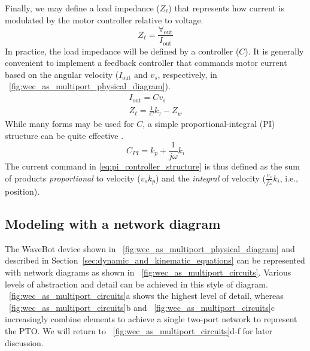 \documentclass[lettersize,journal]{IEEEtran}
\begin{document}
Finally, we may define a load impedance ($Z_\ell$) that represents how current is modulated by the motor controller relative to voltage.
%
\begin{equation}
        Z_\ell = \frac{\forall_{\textrm{out}}}{I_{\textrm{out}}}
        \label{eq:load_impedance}
\end{equation}
%
In practice, the load impedance will be defined by a controller ($C$).
It is generally convenient to implement a feedback controller that commands motor current based on the angular velocity ($I_{\textrm{out}}$ and $v_s$, respectively, in \figurename~\ref{fig:wec_as_multiport_physical_diagram}).
%
\begin{subequations}
\begin{gather}
        I_{\textrm{out}} = C v_s \\  
        Z_\ell = \frac{1}{C} k_\tau - Z_w     
\end{gather}
\end{subequations}
%
While many forms may be used for $C$, a simple proportional-integral (PI) structure can be quite effective \cite{Coe2020a}.
%
\begin{equation}
        C_{PI} = k_p + \frac{1}{j \omega} k_i 
        \label{eq:pi_controller_structure}
\end{equation}
%
The current command in \eqref{eq:pi_controller_structure} is thus defined as the sum of products \emph{proportional} to velocity ($v_s k_p$) and the \emph{integral} of velocity ($\frac{v_s}{j \omega} k_i$, i.e., position).

\subsection{Modeling with a network diagram}\label{sec:modeling_with_a_network_diagram}

The WaveBot device shown in \figurename~\ref{fig:wec_as_multiport_physical_diagram} and described in Section~\ref{sec:dynamic_and_kinematic_equations} can be represented with network diagrams as shown in \figurename~\ref{fig:wec_as_multiport_circuits}.
Various levels of abstraction and detail can be achieved in this style of diagram.
\figurename~\ref{fig:wec_as_multiport_circuits}a shows the highest level of detail, whereas \figurename~\ref{fig:wec_as_multiport_circuits}b and \figurename~\ref{fig:wec_as_multiport_circuits}c increasingly combine elements to achieve a single two-port network to represent the PTO.
We will return to \figurename~\ref{fig:wec_as_multiport_circuits}d-f for later discussion.
\end{document}
